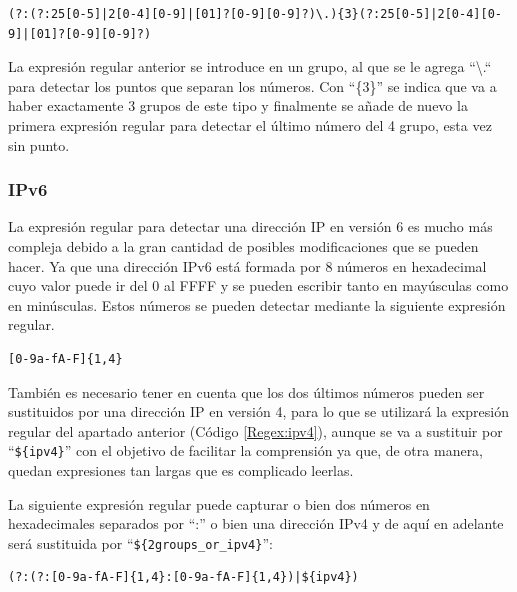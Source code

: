 \begin{lstlisting}[breaklines, caption={Expresión regular IPv4}, label={Regex:ipv4}, captionpos=b]
    (?:(?:25[0-5]|2[0-4][0-9]|[01]?[0-9][0-9]?)\.){3}(?:25[0-5]|2[0-4][0-9]|[01]?[0-9][0-9]?)
\end{lstlisting}

La expresión regular anterior se introduce en un grupo, al que se le agrega “\textbackslash.“ para detectar los puntos que separan los números. Con “\{3\}” se indica que va a haber exactamente 3 grupos de este tipo y finalmente se añade de nuevo la primera expresión regular para detectar el último número del 4 grupo, esta vez sin punto. 

\subsubsection{IPv6}
La expresión regular para detectar una dirección IP en versión 6 es mucho más compleja debido a la gran cantidad de posibles modificaciones que se pueden hacer.
Ya que una dirección IPv6 está formada por 8 números en hexadecimal cuyo valor puede ir del 0 al FFFF y se pueden escribir tanto en mayúsculas como en minúsculas. Estos números se pueden detectar mediante la siguiente expresión regular.

\begin{lstlisting}[breaklines, caption={Expresión regular para capturar un número exadecimal de 4 dígitos}, label={Regex:numero_hex}, captionpos=b]
                    [0-9a-fA-F]{1,4}
\end{lstlisting}

También es necesario tener en cuenta que los dos últimos números pueden ser sustituidos por una dirección IP en versión 4, para lo que se utilizará la expresión regular del apartado anterior (Código \ref{Regex:ipv4}), aunque se va a sustituir por “\verb!${ipv4}!” con el objetivo de facilitar la comprensión ya que, de otra manera, quedan expresiones tan largas que es complicado leerlas. 

La siguiente expresión regular puede capturar o bien dos números en hexadecimales separados por “:” o bien una dirección IPv4 y de aquí en adelante será sustituida por “\verb!${2groups_or_ipv4}!”:

\begin{lstlisting}[breaklines, caption={Expresión regular para capturar los dos últimos números o una dirección IP en versión 4}, label={Regex:2numeros_IPv4}, captionpos=b]
   (?:(?:[0-9a-fA-F]{1,4}:[0-9a-fA-F]{1,4})|${ipv4})
\end{lstlisting}

